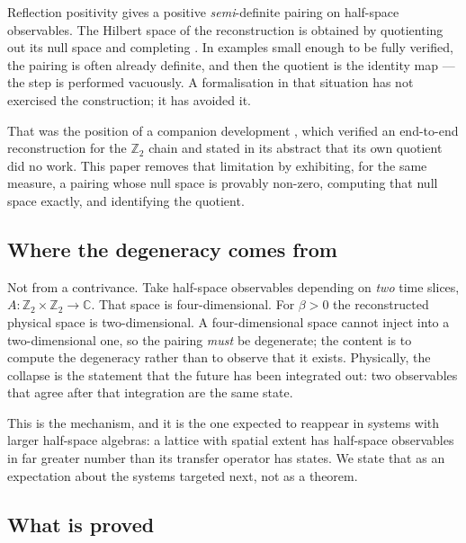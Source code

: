 \documentclass[11pt]{article}
\theoremstyle{definition}
\newcommand{\C}{\mathbb{C}}
\newcommand{\Z}{\mathbb{Z}}
\begin{document}
Reflection positivity gives a positive \emph{semi}-definite pairing on
half-space observables.  The Hilbert space of the reconstruction is obtained by
quotienting out its null space and completing \cite{OsterwalderSeiler,
GlimmJaffe}.  In examples small enough to be fully verified, the pairing is
often already definite, and then the quotient is the identity map --- the step
is performed vacuously.  A formalisation in that situation has not exercised the
construction; it has avoided it.

That was the position of a companion development \cite{ErikssonOSChain}, which
verified an end-to-end reconstruction for the $\Z_2$ chain and stated in its
abstract that its own quotient did no work.  This paper removes that limitation
by exhibiting, for the same measure, a pairing whose null space is provably
non-zero, computing that null space exactly, and identifying the quotient.

\subsection{Where the degeneracy comes from}

Not from a contrivance.  Take half-space observables depending on \emph{two}
time slices, $A : \Z_2 \times \Z_2 \to \C$.  That space is four-dimensional.
For $\beta>0$ the reconstructed physical space is two-dimensional.  A four-dimensional space
cannot inject into a two-dimensional one, so the pairing \emph{must} be
degenerate; the content is to compute the degeneracy rather than to observe that
it exists.  Physically, the collapse is the statement that the future has been
integrated out: two observables that agree after that integration are the same
state.

This is the mechanism, and it is the one expected to reappear in systems with
larger half-space algebras: a lattice with spatial extent has half-space
observables in far greater number than its transfer operator has states.  We
state that as an expectation about the systems targeted next, not as a theorem.

\subsection{What is proved}
\end{document}
